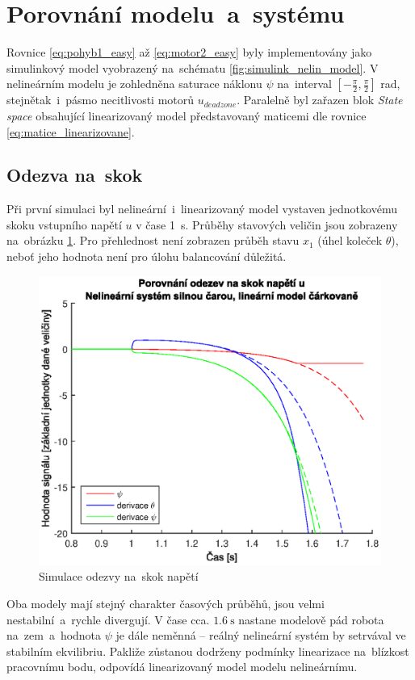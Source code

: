 \documentclass[conference]{IEEEtran}
\begin{document}
\section{Porovnání modelu~a~systému}

Rovnice \eqref{eq:pohyb1_easy} až \eqref{eq:motor2_easy} byly implementovány jako simulinkový model vyobrazený na~schématu \ref{fig:simulink_nelin_model}.
V nelineárním modelu je zohledněna saturace náklonu $\psi$ na~interval $[-\frac{\pi}{2}, \frac{\pi}{2}]$ rad, stejnětak~i~pásmo necitlivosti motorů $u_{deadzone}$.
Paralelně byl zařazen blok \textit{State space} obsahující linearizovaný model představovaný maticemi dle rovnice \eqref{eq:matice_linearizovane}.
\subsection{Odezva na~skok}
Při první simulaci byl nelineární~i~linearizovaný model
vystaven jednotkovému skoku vstupního napětí $u$ v čase 1~\si{\second}. Průběhy stavových veličin jsou zobrazeny na~obrázku \ref{fig:porovnani_skok}.
Pro přehlednost není zobrazen průběh stavu $x_1$ (úhel koleček $\theta$), neboť jeho hodnota není pro úlohu balancování důležitá.
\begin{figure}[htbp]
    \centerline{\includegraphics[width=\linewidth]{porovnani_skok.eps}}
    \caption{Simulace odezvy na~skok napětí}
    \label{fig:porovnani_skok}        
\end{figure}
Oba modely mají stejný charakter časových průběhů, jsou velmi nestabilní~a~rychle divergují.
V čase cca. $1.6~\si{\second}$ nastane modelově pád robota na~zem~a~hodnota $\psi$ je dále neměnná -- reálný nelineární systém by setrvával ve stabilním ekvilibriu.
Pakliže zůstanou dodrženy podmínky linearizace na~blízkost pracovnímu bodu, odpovídá linearizovaný model modelu nelineárnímu.
\end{document}
